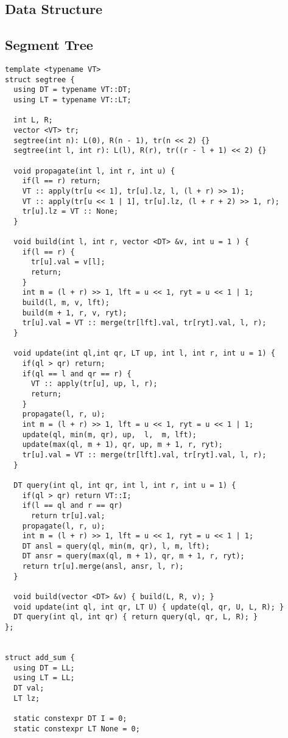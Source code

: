 \documentclass[FSZ,a4paper,onesided]{article}
\begin{document}
\begin{multicols*}{\COLS}
\section{Data Structure}
\subsection{Segment Tree}
\begin{lstlisting}
template <typename VT>
struct segtree {
  using DT = typename VT::DT;
  using LT = typename VT::LT;

  int L, R;
  vector <VT> tr;
  segtree(int n): L(0), R(n - 1), tr(n << 2) {}
  segtree(int l, int r): L(l), R(r), tr((r - l + 1) << 2) {}

  void propagate(int l, int r, int u) {
    if(l == r) return;
    VT :: apply(tr[u << 1], tr[u].lz, l, (l + r) >> 1);
    VT :: apply(tr[u << 1 | 1], tr[u].lz, (l + r + 2) >> 1, r);
    tr[u].lz = VT :: None;
  }

  void build(int l, int r, vector <DT> &v, int u = 1 ) {
    if(l == r) {
      tr[u].val = v[l];
      return;
    }
    int m = (l + r) >> 1, lft = u << 1, ryt = u << 1 | 1;
    build(l, m, v, lft);
    build(m + 1, r, v, ryt);
    tr[u].val = VT :: merge(tr[lft].val, tr[ryt].val, l, r);
  }

  void update(int ql,int qr, LT up, int l, int r, int u = 1) {
    if(ql > qr) return;
    if(ql == l and qr == r) {
      VT :: apply(tr[u], up, l, r);
      return;
    }
    propagate(l, r, u);
    int m = (l + r) >> 1, lft = u << 1, ryt = u << 1 | 1;
    update(ql, min(m, qr), up,  l,  m, lft);
    update(max(ql, m + 1), qr, up, m + 1, r, ryt);
    tr[u].val = VT :: merge(tr[lft].val, tr[ryt].val, l, r);
  }

  DT query(int ql, int qr, int l, int r, int u = 1) {
    if(ql > qr) return VT::I;
    if(l == ql and r == qr)
      return tr[u].val;
    propagate(l, r, u);
    int m = (l + r) >> 1, lft = u << 1, ryt = u << 1 | 1;
    DT ansl = query(ql, min(m, qr), l, m, lft);
    DT ansr = query(max(ql, m + 1), qr, m + 1, r, ryt);
    return tr[u].merge(ansl, ansr, l, r);
  }

  void build(vector <DT> &v) { build(L, R, v); }
  void update(int ql, int qr, LT U) { update(ql, qr, U, L, R); }
  DT query(int ql, int qr) { return query(ql, qr, L, R); }
};


struct add_sum {
  using DT = LL;
  using LT = LL;
  DT val;
  LT lz;

  static constexpr DT I = 0; 
  static constexpr LT None = 0;
  

\end{lstlisting}
\end{multicols*}
\end{document}
